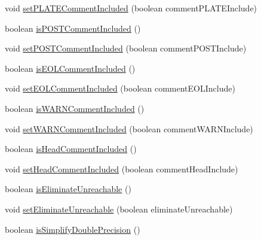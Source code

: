 \begin{DoxyCompactItemize}
\item 
void \mbox{\hyperlink{classghidra_1_1app_1_1decompiler_1_1_decompile_options_afa1f765a094db340ffd4300dea5c7817}{set\+P\+L\+A\+T\+E\+Comment\+Included}} (boolean comment\+P\+L\+A\+T\+E\+Include)
\item 
boolean \mbox{\hyperlink{classghidra_1_1app_1_1decompiler_1_1_decompile_options_ae53fc6f71e3e555a78d6d738503e1041}{is\+P\+O\+S\+T\+Comment\+Included}} ()
\item 
void \mbox{\hyperlink{classghidra_1_1app_1_1decompiler_1_1_decompile_options_a6fab78e0beb28c5fe15a21494227af0e}{set\+P\+O\+S\+T\+Comment\+Included}} (boolean comment\+P\+O\+S\+T\+Include)
\item 
boolean \mbox{\hyperlink{classghidra_1_1app_1_1decompiler_1_1_decompile_options_a75d81c5385c82ca1fcb52293f92072e3}{is\+E\+O\+L\+Comment\+Included}} ()
\item 
void \mbox{\hyperlink{classghidra_1_1app_1_1decompiler_1_1_decompile_options_a60782af7655d2536f53e81785db18f36}{set\+E\+O\+L\+Comment\+Included}} (boolean comment\+E\+O\+L\+Include)
\item 
boolean \mbox{\hyperlink{classghidra_1_1app_1_1decompiler_1_1_decompile_options_a5fce25579484459601b1be3bd0d845f9}{is\+W\+A\+R\+N\+Comment\+Included}} ()
\item 
void \mbox{\hyperlink{classghidra_1_1app_1_1decompiler_1_1_decompile_options_aa23089cb5060bcfbd6ec4ed5f9bf819e}{set\+W\+A\+R\+N\+Comment\+Included}} (boolean comment\+W\+A\+R\+N\+Include)
\item 
boolean \mbox{\hyperlink{classghidra_1_1app_1_1decompiler_1_1_decompile_options_a76c57ad6cd6a97b2a8c3383fc7d6d7ac}{is\+Head\+Comment\+Included}} ()
\item 
void \mbox{\hyperlink{classghidra_1_1app_1_1decompiler_1_1_decompile_options_adbc7d53257f3a0907df336785b5d1c4d}{set\+Head\+Comment\+Included}} (boolean comment\+Head\+Include)
\item 
boolean \mbox{\hyperlink{classghidra_1_1app_1_1decompiler_1_1_decompile_options_a76d3f9af039f7fc03e9dd3bb1418d118}{is\+Eliminate\+Unreachable}} ()
\item 
void \mbox{\hyperlink{classghidra_1_1app_1_1decompiler_1_1_decompile_options_a8218f999f2edf040fb14eda6559d9f0d}{set\+Eliminate\+Unreachable}} (boolean eliminate\+Unreachable)
\item 
boolean \mbox{\hyperlink{classghidra_1_1app_1_1decompiler_1_1_decompile_options_a40272a98a8f387547db48f11b17e6d12}{is\+Simplify\+Double\+Precision}} ()
\item 

\end{DoxyCompactItemize}

